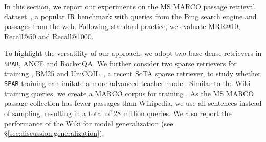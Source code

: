 \documentclass[11pt]{article}
\newcommand{\spar}{\texttt{SPAR}\xspace}
\newcommand{\lexmodelsymbol}{\xspace}
\newcommand{\secref}[1]{\S\ref{#1}}
\begin{document}
In this section, we report our experiments on the MS MARCO passage retrieval dataset~\cite{bajaj2018ms}, a popular IR benchmark with queries from the Bing search engine and passages from the web.
Following standard practice, we evaluate MRR@10, Recall@50 and Recall@1000.

To highlight the versatility of our approach, we adopt two base dense retrievers in \spar{}, ANCE and RocketQA.
We further consider two sparse retrievers for training \lexmodelsymbol{}, BM25 and UniCOIL~\cite{lin2021brief}, a recent SoTA sparse retriever, to study whether \spar{} training can imitate a more advanced teacher model.
Similar to the Wiki training queries, we create a MARCO corpus for training \lexmodelsymbol{}.
As the MS MARCO passage collection has fewer passages than Wikipedia, we use all sentences instead of sampling, resulting in a total of 28 million queries.
We also report the performance of the Wiki \lexmodelsymbol{} for model generalization (see \secref{sec:discussion:generalization}).
\end{document}
